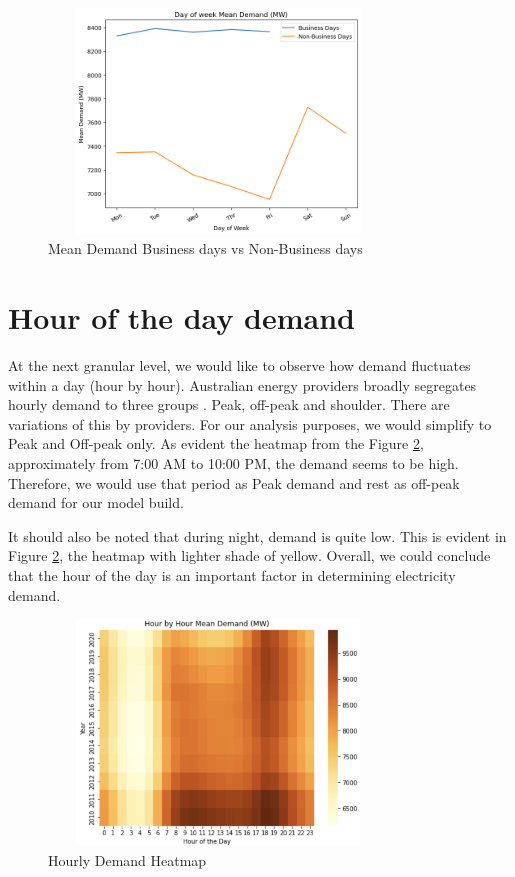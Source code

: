 \documentclass[mstat,12pt]{unswthesis}
\begin{document}
\begin{figure}[H]
\centering
\includegraphics[width=0.80\textwidth,height=6cm]{day_demand.png}
\caption{Mean Demand Business days vs Non-Business days}
\label{day_demand}
\end{figure}

\hypertarget{hour-of-the-day-demand}{%
\section{Hour of the day demand}\label{hour-of-the-day-demand}}

At the next granular level, we would like to observe how demand
fluctuates within a day (hour by hour). Australian energy providers
broadly segregates hourly demand to three groups
\cite{wrigley_2019_peak}. Peak, off-peak and shoulder. There are
variations of this by providers. For our analysis purposes, we would
simplify to Peak and Off-peak only. As evident the heatmap from the
Figure \ref{hour_heat}, approximately from 7:00 AM to 10:00 PM, the
demand seems to be high. Therefore, we would use that period as Peak
demand and rest as off-peak demand for our model build.

It should also be noted that during night, demand is quite low. This is
evident in Figure \ref{hour_heat}, the heatmap with lighter shade of
yellow. Overall, we could conclude that the hour of the day is an
important factor in determining electricity demand.

\begin{figure}[H]
\centering
\includegraphics[width=0.80\textwidth,height=6cm]{hour_heat.png}
\caption{Hourly Demand Heatmap}
\label{hour_heat}
\end{figure}
\end{document}
